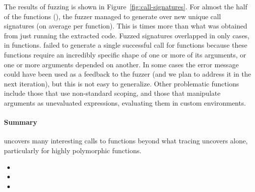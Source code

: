 \documentclass[sigplan,anonymous,review]{acmart}
\begin{document}
The results of fuzzing is shown in Figure~\ref{fig:call-signatures}.
For almost the half of the functions (\UFNumFunctionSignatrSignatureRatio), the fuzzer managed to generate over \UFSignatrSignaturesRnd new unique call signatures (on average \UFAvgNewSignatrSignature per function).
This is \UFSignatrBaselineSignaturesRatio times more than what was obtained from just running the extracted code.
Fuzzed signatures overlapped in only \UFSharedSignature cases, in \UFSharedSignatureFunction functions.
\tool failed to generate a single successful call for \UFNumMissingFunctionSignatr functions because these functions require an incredibly specific shape of one or more of its arguments, or one or more arguments depended on another.
In some cases the error message could have been used as a feedback to the fuzzer (and we plan to address it in the next iteration), but this is not easy to generalize.
Other problematic functions include those that use non-standard scoping, and those that manipulate arguments as unevaluated expressions, evaluating them in custom environments.

\paragraph{Summary}

\tool uncovers many interesting calls to functions beyond what tracing uncovers alone, particularly for highly polymorphic functions.



\begin{itemize}
    \item {} 
    \item {} 
    \item {} 
\end{itemize}
\end{document}
